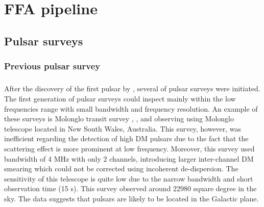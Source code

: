 \documentclass[thesis_msc.tex]{subfiles}
\begin{document}
\chapter{FFA pipeline} \label{Chapter:FFA_c}
 	\section{Pulsar surveys}
        \subsection{Previous pulsar survey } \label{survey}
        \paragraph{} After the discovery of the first pulsar by \citep{HEWISH1968}, several of pulsar surveys were initiated. The first generation of pulsar surveys could inspect mainly within the low frequencies range with small bandwidth and frequency resolution. An example of these surveys is Molonglo transit survey \citep{Large:1968:mi}, \citep{Vaughan:1970:lm}, and \citep{Davies:1970:lm} observing using Molonglo telescope located in New South Wales, Australia. This survey, however, was inefficient regarding the detection of high DM pulsars due to the fact that the scattering effect is more prominent at low frequency. Moreover, this survey used bandwidth of 4 MHz with only 2 channels, introducing larger inter-channel DM smearing which could not be corrected using incoherent de-dispersion. The sensitivity of this telescope is quite low due to the narrow bandwidth and short observation time (15 s). This survey observed around 22980 square degree in the sky. The data suggests that pulsars are likely to be located in the Galactic plane. 
        
\end{document}
